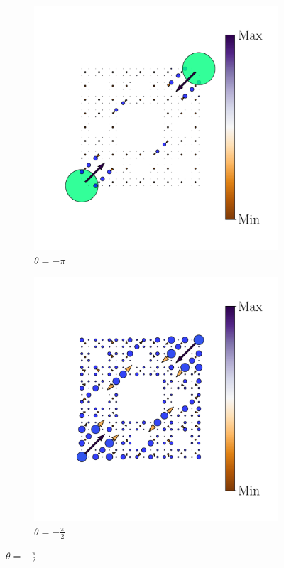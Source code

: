 \begin{figure}[h!]
     
     \begin{minipage}[h!]{1.1\textwidth}
          \begin{subfigure}[b!]{0.2 \textwidth}
             \caption{$\theta = -\pi$}
             \includegraphics[width=\textwidth]{Imagenes/Resultados_pump_Fractal/xy/hoti_pomp_xy_neg1.pdf}
         \end{subfigure}\hspace*{-0.5em}
          \begin{subfigure}[b!]{0.2 \textwidth}
             \caption*{$\theta = -\frac{\pi}{2}$}
             \includegraphics[width=\textwidth]{Imagenes/Resultados_pump_Fractal/xy/hoti_pomp_xy_neg2.pdf}

\end{subfigure}
\end{minipage}
\end{figure}
